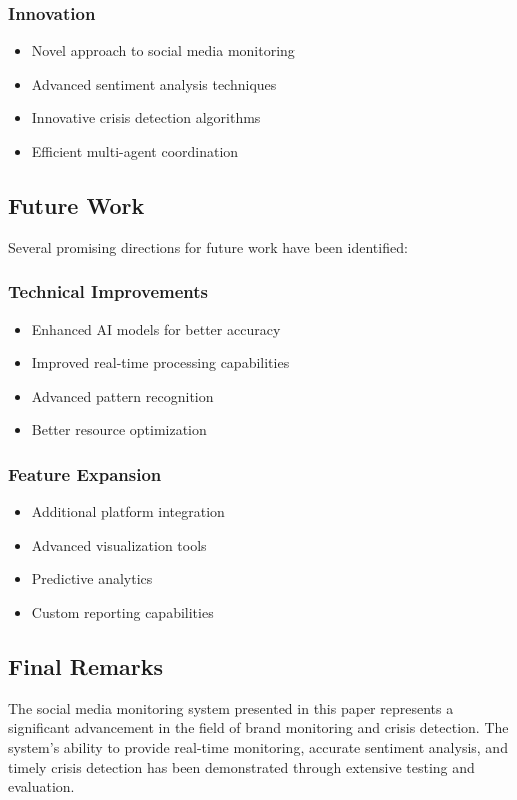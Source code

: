\subsubsection{Innovation}
\begin{itemize}
    \item Novel approach to social media monitoring
    \item Advanced sentiment analysis techniques
    \item Innovative crisis detection algorithms
    \item Efficient multi-agent coordination
\end{itemize}

\subsection{Future Work}
Several promising directions for future work have been identified:

\subsubsection{Technical Improvements}
\begin{itemize}
    \item Enhanced AI models for better accuracy
    \item Improved real-time processing capabilities
    \item Advanced pattern recognition
    \item Better resource optimization
\end{itemize}

\subsubsection{Feature Expansion}
\begin{itemize}
    \item Additional platform integration
    \item Advanced visualization tools
    \item Predictive analytics
    \item Custom reporting capabilities
\end{itemize}

\subsection{Final Remarks}
The social media monitoring system presented in this paper represents a significant advancement in the field of brand monitoring and crisis detection. The system's ability to provide real-time monitoring, accurate sentiment analysis, and timely crisis detection has been demonstrated through extensive testing and evaluation.


